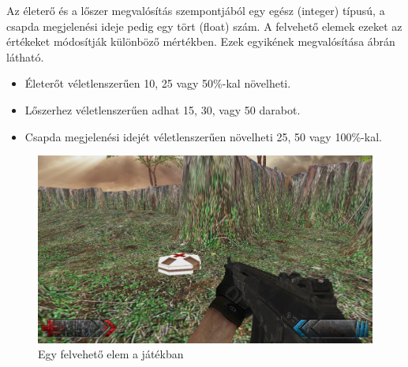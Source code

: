 
Az életerő és a lőszer megvalósítás szempontjából egy egész (integer) típusú, a csapda megjelenési ideje pedig egy tört (float) szám. A felvehető elemek ezeket az értékeket módosítják különböző mértékben. Ezek egyikének megvalósítása  ábrán látható.

\begin{itemize}
\item Életerőt véletlenszerűen 10, 25 vagy 50\%-kal növelheti. 
\item Lőszerhez véletlenszerűen adhat 15, 30, vagy 50 darabot.
\item Csapda megjelenési idejét véletlenszerűen növelheti 25, 50 vagy 100\%-kal.
\end{itemize}

\begin{figure}[h]
\centering
\includegraphics[scale=0.4]{kepek/health.png}
\caption{Egy felvehető elem a játékban}
\label{fig:health}
\end{figure}

